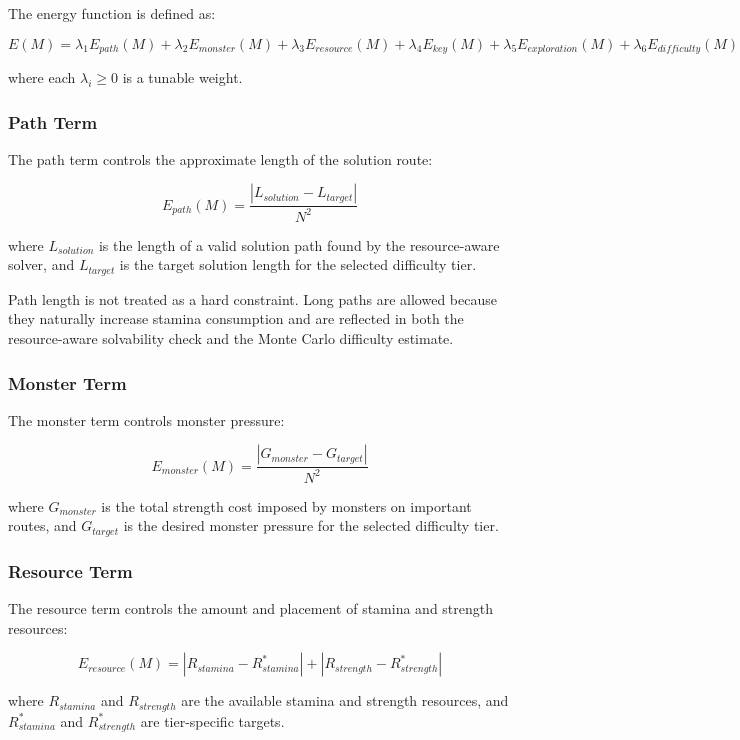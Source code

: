 \documentclass[11pt]{article}
\begin{document}
The energy function is defined as:

\[
E(M) =
\lambda_1 E_{path}(M)
+ \lambda_2 E_{monster}(M)
+ \lambda_3 E_{resource}(M)
+ \lambda_4 E_{key}(M)
+ \lambda_5 E_{exploration}(M)
+ \lambda_6 E_{difficulty}(M)
\]

where each $\lambda_i \geq 0$ is a tunable weight.

\subsubsection{Path Term}

The path term controls the approximate length of the solution route:

\[
E_{path}(M) = \frac{|L_{solution} - L_{target}|}{N^2}
\]

where $L_{solution}$ is the length of a valid solution path found by the resource-aware solver, and $L_{target}$ is the target solution length for the selected difficulty tier.

Path length is not treated as a hard constraint. Long paths are allowed because they naturally increase stamina consumption and are reflected in both the resource-aware solvability check and the Monte Carlo difficulty estimate.

\subsubsection{Monster Term}

The monster term controls monster pressure:

\[
E_{monster}(M) = \frac{|G_{monster} - G_{target}|}{N^2}
\]

where $G_{monster}$ is the total strength cost imposed by monsters on important routes, and $G_{target}$ is the desired monster pressure for the selected difficulty tier.

\subsubsection{Resource Term}

The resource term controls the amount and placement of stamina and strength resources:

\[
E_{resource}(M) =
|R_{stamina} - R^{*}_{stamina}|
+
|R_{strength} - R^{*}_{strength}|
\]

where $R_{stamina}$ and $R_{strength}$ are the available stamina and strength resources, and $R^{*}_{stamina}$ and $R^{*}_{strength}$ are tier-specific targets.
\end{document}
